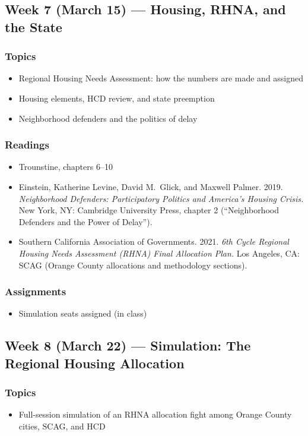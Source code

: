 \documentclass[12pt]{article}
\begin{document}
\subsection*{Week 7 (March 15) --- Housing, RHNA, and the State}
    \subsubsection*{Topics}
        \begin{itemize}
            \item Regional Housing Needs Assessment: how the numbers are made and assigned
            \item Housing elements, HCD review, and state preemption
            \item Neighborhood defenders and the politics of delay
        \end{itemize}
    \subsubsection*{Readings}
        \begin{itemize}
            \item Trounstine, chapters 6--10
            \item Einstein, Katherine Levine, David M.\ Glick, and Maxwell Palmer. 2019. \emph{Neighborhood Defenders: Participatory Politics and America's Housing Crisis.} New York, NY: Cambridge University Press, chapter 2 (``Neighborhood Defenders and the Power of Delay'').
            \item Southern California Association of Governments. 2021. \emph{6th Cycle Regional Housing Needs Assessment (RHNA) Final Allocation Plan.} Los Angeles, CA: SCAG (Orange County allocations and methodology sections).
        \end{itemize}
    \subsubsection*{Assignments}
        \begin{itemize}
            \item Simulation seats assigned (in class)
        \end{itemize}

\subsection*{Week 8 (March 22) --- Simulation: The Regional Housing Allocation}
    \subsubsection*{Topics}
        \begin{itemize}
            \item Full-session simulation of an RHNA allocation fight among Orange County cities, SCAG, and HCD
        \end{itemize}
\end{document}
